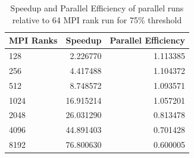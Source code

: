 \documentclass[11pt]{article}
\numberwithin{figure}{section}
\begin{document}
\begin{center}
\begin{table}[h]
\begin{tabular}{| l | r | r | }
\hline
MPI Ranks & Speedup & Parallel Efficiency \\ \hline
128 & 2.226770 & 1.113385 \\ \hline
256 & 4.417488 & 1.104372 \\ \hline
512 & 8.748572 & 1.093571 \\ \hline
1024 & 16.915214 & 1.057201 \\ \hline
2048 & 26.031290 & 0.813478 \\ \hline
4096 & 44.891403 & 0.701428 \\ \hline
8192 & 76.800630 & 0.600005 \\ \hline
\end{tabular}
\caption{Speedup and Parallel Efficiency of parallel runs relative to 64 MPI rank run for 75\% threshold}

\end{table}
\end{center} 
\end{document}
